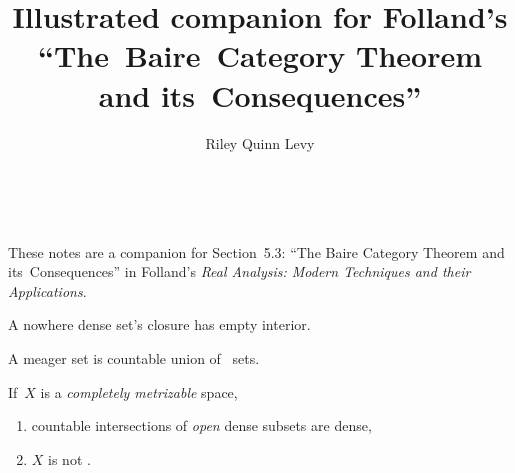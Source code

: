 \documentclass{scrartcl}
\author{Riley Quinn Levy}
\title{Illustrated companion for Folland's ``The~Baire~Category Theorem and its~Consequences''}
\begin{document}
\begin{center}
  \begin{minipage}{.8\linewidth}
    \centering
    {\normalfont\bfseries\LARGE\color[gray]{.3}\@title}
  \end{minipage} \\
  \@author{}\quad\@date
  \makeatother
\end{center}
These notes are a companion for Section~5.3: ``The Baire Category Theorem and its~Consequences'' in Folland's \emph{Real Analysis: Modern Techniques and their Applications}.
\begin{defn}\label{nowhere-dense}
  A nowhere dense set's closure has empty interior.\cite{nowhere-dense}
\end{defn}
\begin{defn}[meager]\label{meager}
  A meager set is countable union of ~sets. \cite[pg.\ 161]{folland}
\end{defn}
\begin{theorem}\label{baire category}
  If\euleritcorrect\ \(X\) is a \emph{completely metrizable} space,
  \begin{enumerate}
  \item countable intersections of \emph{open} dense subsets are dense,
  \item \(X\) is not . \cite[pg.\ 161]{folland}
  \end{enumerate}
\end{theorem}
\end{document}

